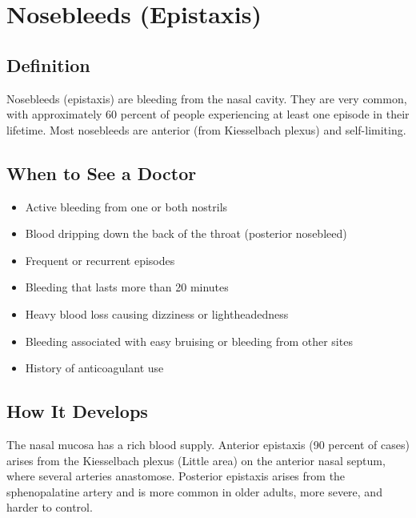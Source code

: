 \chapter{Nosebleeds (Epistaxis)}

\section*{Definition}
Nosebleeds (epistaxis) are bleeding from the nasal cavity. They are very common, with approximately 60 percent of people experiencing at least one episode in their lifetime. Most nosebleeds are anterior (from Kiesselbach plexus) and self-limiting.

\section*{When to See a Doctor}
\begin{itemize}
\item Active bleeding from one or both nostrils
\item Blood dripping down the back of the throat (posterior nosebleed)
\item Frequent or recurrent episodes
\item Bleeding that lasts more than 20 minutes
\item Heavy blood loss causing dizziness or lightheadedness
\item Bleeding associated with easy bruising or bleeding from other sites
\item History of anticoagulant use
\end{itemize}

\section*{How It Develops}
The nasal mucosa has a rich blood supply. Anterior epistaxis (90 percent of cases) arises from the Kiesselbach plexus (Little area) on the anterior nasal septum, where several arteries anastomose. Posterior epistaxis arises from the sphenopalatine artery and is more common in older adults, more severe, and harder to control.

